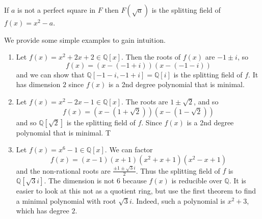   \begin{corollary}
    If $a$ is not a perfect square in $F$ then $F(\sqrt{a})$ is the splitting field of $f(x) = x^2 - a$. 
  \end{corollary}

  \begin{example}
    We provide some simple examples to gain intuition. 
    \begin{enumerate}
      \item Let $f(x) = x^2 + 2x + 2 \in \mathbb{Q}[x]$. Then the roots of $f(x)$ are $-1 \pm i$, so 
      \begin{equation}
        f(x) = (x - (-1 + i)) (x - (-1 - i)) 
      \end{equation}
      and we can show that $\mathbb{Q}[-1 - i, -1+i] = \mathbb{Q}[i]$ is the splitting field of $f$. It has dimension $2$ since $f(x)$ is a 2nd degree polynomial that is minimal. 

      \item Let $f(x) = x^2 - 2x - 1 \in \mathbb{Q}[x]$. The roots are $1 \pm \sqrt{2}$, and so 
      \begin{equation}
        f(x) = (x - (1 + \sqrt{2})) (x - (1 - \sqrt{2}))
      \end{equation}
      and so $\mathbb{Q}[\sqrt{2}]$ is the splitting field of $f$. Since $f(x)$ is a 2nd degree polynomial that is minimal. T

      \item Let $f(x) = x^6 - 1 \in \mathbb{Q}[x]$. We can factor 
      \begin{equation}
        f(x) = (x-1) (x + 1) (x^2 + x + 1) (x^2 - x + 1)
      \end{equation} 
      and the non-rational roots are $\frac{\pm 1 \pm \sqrt{3} i}{2}$. Thus the splitting field of $f$ is $\mathbb{Q}[\sqrt{3} i]$. The dimension is not 6 because $f(x)$ is reducible over $\mathbb{Q}$. It is easier to look at this not as a quotient ring, but use the first theorem to find a minimal polynomial with root $\sqrt{3} i$. Indeed, such a polynomial is $x^2 + 3$, which has degree $2$. 
    \end{enumerate}
  \end{example}

